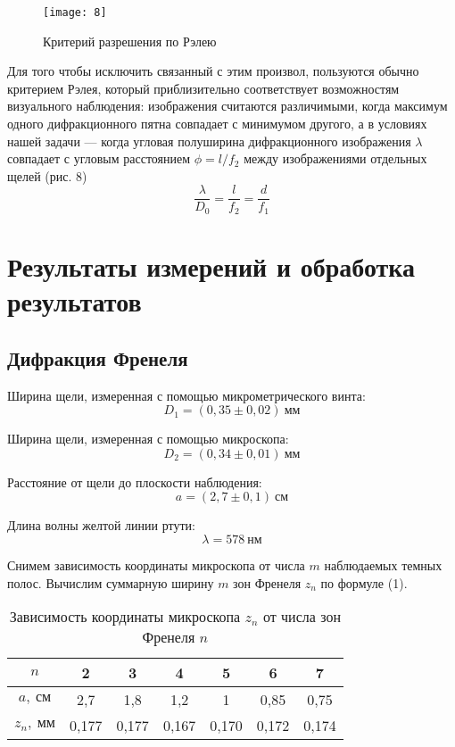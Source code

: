 \documentclass[a4paper, 12pt]{article}
\begin{document}
\begin{wrapfigure}{4}{0.34\linewidth}
    \vspace{-10pt}
    \texttt{[image: 8]}
    \caption{Критерий разрешения по Рэлею}
\end{wrapfigure}

Для того чтобы исключить связанный с этим произвол, пользуются обычно
критерием Рэлея, который приблизительно соответствует возможностям
визуального наблюдения: изображения считаются различимыми, когда
максимум одного дифракционного пятна совпадает с минимумом другого, а
в условиях нашей задачи — когда угловая полуширина дифракционного
изображения $\lambda$ совпадает с угловым расстоянием $\phi = l/f_2$ между
изображениями отдельных щелей (рис. 8)
\begin{equation}
    \frac{\lambda}{D_0} = \frac{l}{f_2} = \frac{d}{f_1}
\end{equation}



\section{Результаты измерений и обработка результатов}
\subsection*{Дифракция Френеля}
Ширина щели, измеренная с помощью микрометрического винта:
\[
    D_1 = (0,35 \pm 0,02)\ \text{мм}
\]

Ширина щели, измеренная с помощью микроскопа:
\[
    D_2 = (0,34 \pm 0,01)\ \text{мм}
\]


Расстояние от щели до плоскости наблюдения:
\[
    a = (2,7 \pm 0,1)\ \text{см}
\]

Длина волны желтой линии ртути:
\[
    \lambda = 578\ \text{нм}
\]


Снимем зависимость координаты микроскопа от числа $m$ наблюдаемых
темных полос. Вычислим суммарную ширину $m$ зон Френеля $z_n$ по
формуле (1).


\begin{table}[H]
\centering
\begin{tabular}{|c|c|c|c|c|c|c|}
\hline
$n$  & 2     & 3     & 4     & 5     & 6     & 7     \\ \hline
$a,\ \text{см}$  & 2,7   & 1,8   & 1,2   & 1     & 0,85  & 0,75  \\ \hline
$z_n,\ \text{мм}$ & 0,177 & 0,177 & 0,167 & 0,170 & 0,172 & 0,174 \\ \hline
\end{tabular}
\caption{Зависимость координаты микроскопа $z_n$ от числа зон Френеля $n$}
\end{table}
\end{document}
